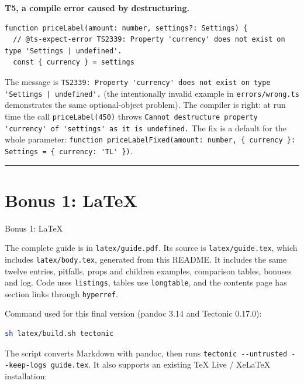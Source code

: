 \textbf{T5, a compile error caused by destructuring.}

\begin{lstlisting}
function priceLabel(amount: number, settings?: Settings) {
  // @ts-expect-error TS2339: Property 'currency' does not exist on type 'Settings | undefined'.
  const { currency } = settings
\end{lstlisting}

The message is \passthrough{\lstinline!TS2339: Property 'currency' does not exist on type 'Settings | undefined'.!} (the intentionally invalid example in \passthrough{\lstinline!errors/wrong.ts!} demonstrates the same optional-object problem).
The compiler is right: at run time the call \passthrough{\lstinline!priceLabel(450)!} throws \passthrough{\lstinline!Cannot destructure property 'currency' of 'settings' as it is undefined.!}
The fix is a default for the whole parameter: \passthrough{\lstinline!function priceLabelFixed(amount: number, \{ currency \}: Settings = \{ currency: 'TL' \})!}.

\begin{center}\rule{0.5\linewidth}{0.5pt}\end{center}

\section{Bonus 1: LaTeX}\label{bonus-1-latex}

Bonus 1: LaTeX

The complete guide is in \passthrough{\lstinline!latex/guide.pdf!}. Its source is \passthrough{\lstinline!latex/guide.tex!}, which includes
\passthrough{\lstinline!latex/body.tex!}, generated from this README. It includes the same twelve entries, pitfalls,
props and children examples, comparison tables, bonuses and log. Code uses \passthrough{\lstinline!listings!},
tables use \passthrough{\lstinline!longtable!}, and the contents page has section links through \passthrough{\lstinline!hyperref!}.

Command used for this final version (pandoc 3.14 and Tectonic 0.17.0):

\begin{lstlisting}[language=sh]
sh latex/build.sh tectonic
\end{lstlisting}

The script converts Markdown with pandoc, then runs \passthrough{\lstinline!tectonic --untrusted --keep-logs guide.tex!}.
It also supports an existing TeX Live / XeLaTeX installation:

